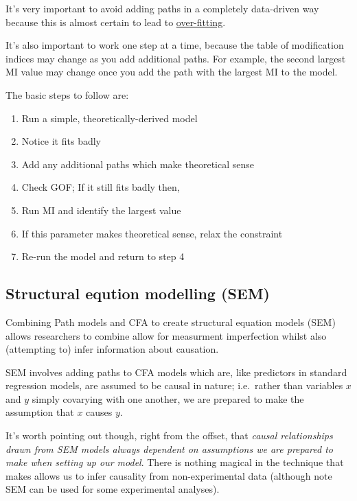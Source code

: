 \documentclass[]{article}
\providecommand{\tightlist}{%
  \setlength{\itemsep}{0pt}\setlength{\parskip}{0pt}}
\begin{document}
{It's very important to avoid adding paths in a completely data-driven way
because this is almost certain to lead to \protect\hyperlink{over-fitting}{over-fitting}.}

It's also important to work one step at a time, because the table of
modification indices may change as you add additional paths. For example, the
second largest MI value may change once you add the path with the largest MI to
the model.

The basic steps to follow are:

\begin{enumerate}
\def\labelenumi{\arabic{enumi}.}
\tightlist
\item
  Run a simple, theoretically-derived model
\item
  Notice it fits badly
\item
  Add any additional paths which make theoretical sense
\item
  Check GOF; If it still fits badly then,
\item
  Run MI and identify the largest value
\item
  If this parameter makes theoretical sense, relax the constraint
\item
  Re-run the model and return to step 4
\end{enumerate}

\hypertarget{sem}{%
\subsection*{Structural eqution modelling (SEM)}\label{sem}}

Combining Path models and CFA to create structural equation models (SEM) allows
researchers to combine allow for measurment imperfection whilst also (attempting
to) infer information about causation.

SEM involves adding paths to CFA models which are, like predictors in standard
regression models, are assumed to be causal in nature; i.e.~rather than
variables \(x\) and \(y\) simply covarying with one another, we are prepared to make
the assumption that \(x\) causes \(y\).

It's worth pointing out though, right from the offset, that \emph{causal
relationships drawn from SEM models always dependent on assumptions we are
prepared to make when setting up our model}. There is nothing magical in the
technique that makes allows us to infer causality from non-experimental data
(although note SEM can be used for some experimental analyses).
\end{document}
